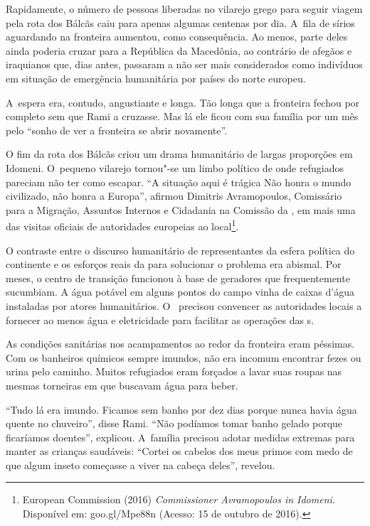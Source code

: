 Rapidamente, o número de pessoas liberadas no vilarejo grego para seguir viagem
pela rota dos Bálcãs caiu para apenas algumas centenas por dia. A~fila de sírios
aguardando na fronteira aumentou, como consequência. Ao menos, parte
deles ainda poderia cruzar para a República da Macedônia, ao contrário
de afegãos e iraquianos que, dias antes, passaram a não ser mais
considerados como indivíduos em situação de emergência humanitária por
países do norte europeu. 

A~espera era, contudo, angustiante e longa. Tão longa que a fronteira fechou
por completo sem que Rami a cruzasse. Mas lá ele ficou com sua família
por um mês pelo ``sonho de ver a fronteira se abrir novamente''.

O fim da rota dos Bálcãs criou um drama humanitário de largas proporções
em Idomeni. O~pequeno vilarejo tornou"-se um limbo político de onde
refugiados pareciam não ter como escapar. ``A situação aqui é trágica
\redondo{[…]} Não honra o mundo civilizado, não honra a Europa'',
afirmou Dimitris Avramopoulos, Comissário para a Migração, Assuntos
Internos e Cidadania na Comissão da , em mais uma das visitas oficiais
de autoridades europeias ao local\footnote{ European Commission (2016) \emph{Commissioner
Avramopoulos in Idomeni}. Disponível em:
goo.gl/Mpe88n (Acesso: 15
de outubro de 2016).}.

O contraste entre o discurso humanitário de representantes da esfera
política do continente e os esforços reais da  para solucionar o
problema era abismal. Por meses, o centro de transição funcionou à base
de geradores que frequentemente sucumbiam. A água potável em alguns
pontos do campo vinha de caixas d'água instaladas por atores
humanitários. O~ precisou convencer as autoridades locais a fornecer
ao menos água e eletricidade para facilitar as operações das s.

As condições sanitárias nos acampamentos ao redor da fronteira eram péssimas. 
Com os banheiros químicos sempre imundos, não era incomum encontrar fezes ou 
urina pelo caminho. Muitos refugiados eram forçados a lavar suas roupas nas 
mesmas torneiras em que buscavam água para beber.

``Tudo lá era imundo. Ficamos sem banho por dez dias porque nunca havia
água quente no chuveiro'', disse Rami. ``Não podíamos tomar banho gelado
porque ficaríamos doentes'', explicou. A~família precisou adotar
medidas extremas para manter as crianças saudáveis: ``Cortei os cabelos
dos meus primos com medo de que algum inseto começasse a viver na cabeça
deles'', revelou.

